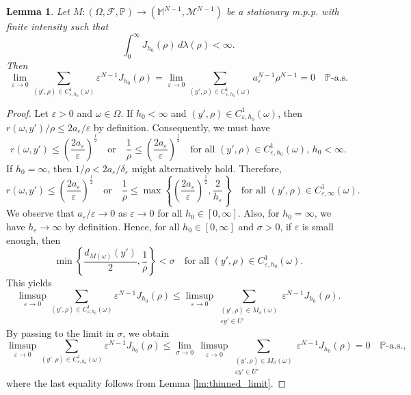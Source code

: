 \documentclass{article}
\numberwithin{equation}{section}
\newtheorem{lemma}[theorem]{Lemma}
\theoremstyle{definition}
\theoremstyle{remark}
\begin{document}
\begin{lemma} \label{lm:negligible_cluster_1}
    Let $M :(\Omega, \mathcal{F}, \mathbb{P}) \rightarrow (\mathbb{M}^{N - 1}, \mathcal{M}^{N - 1})$ be a stationary m.p.p. with finite intensity such that
    \[
    \int_0^\infty J_{h_0}(\rho) \, d\lambda(\rho) < \infty.
    \]
    Then
    \begin{equation} \label{eq:negligible_cluster_1}
        \lim_{\varepsilon \to 0} \sum_{(y', \rho) \in C_{\varepsilon, h_0}^1(\omega)} \varepsilon^{N - 1} J_{h_0}(\rho) = \lim_{\varepsilon \to 0} \sum_{(y', \rho) \in C_{\varepsilon, h_0}^1(\omega)} a_\varepsilon^{N - 1} \rho^{N - 1} = 0 \quad \mathbb{P}\text{-a.s.}
    \end{equation}
\end{lemma}

\begin{proof}
     Let $\varepsilon > 0$ and $\omega \in \Omega$. If $h_0 < \infty$ and $(y', \rho) \in C_{\varepsilon, h_0}^1(\omega)$, then $r(\omega, y')/\rho \le 2 a_\varepsilon/\varepsilon$ by definition. Consequently, we must have
    \[
    r(\omega, y') \le \left(\frac{2 a_\varepsilon}{\varepsilon}\right)^\frac{1}{2} \quad \text{or} \quad \frac{1}{\rho} \le \left(\frac{2 a_\varepsilon}{\varepsilon}\right)^\frac{1}{2} \quad \text{for all } (y', \rho) \in C_{\varepsilon, h_0}^1(\omega), \, h_0 < \infty.
    \]
    If $h_0 = \infty$, then $1/\rho < 2 a_\varepsilon/\delta_\varepsilon$ might alternatively hold. Therefore,
    \[
    r(\omega, y') \le \left(\frac{2 a_\varepsilon}{\varepsilon}\right)^\frac{1}{2} \quad \text{or} \quad \frac{1}{\rho} \le \max \left\{\left(\frac{2 a_\varepsilon}{\varepsilon}\right)^\frac{1}{2}, \frac{2}{h_\varepsilon}\right\} \quad \text{for all } (y', \rho) \in C_{\varepsilon, \infty}^1(\omega).
    \]
    We observe that $a_\varepsilon/\varepsilon \to 0$ as $\varepsilon \to 0$ for all $h_0 \in [0, \infty]$. Also, for $h_0 = \infty$, we have $h_\varepsilon \to \infty$ by definition. Hence, for all $h_0 \in [0, \infty]$ and $\sigma > 0$, if $\varepsilon$ is small enough, then
    \[
    \min \left\{\frac{d_{M(\omega)}(y')}{2}, \frac{1}{\rho}\right\} < \sigma \quad \text{for all } (y', \rho) \in C_{\varepsilon, h_0}^1(\omega).
    \]
    This yields
    \[
    \limsup_{\varepsilon \to 0} \sum_{(y', \rho) \in C_{\varepsilon, h_0}^1(\omega)} \varepsilon^{N - 1} J_{h_0}(\rho) \le \limsup_{\varepsilon \to 0} \sum \limits_{\substack{(y', \rho) \in M_\sigma(\omega) \\ \varepsilon y' \in U'}} \varepsilon^{N - 1} J_{h_0}(\rho).
    \]
    By passing to the limit in $\sigma$, we obtain
    \[
    \limsup_{\varepsilon \to 0} \sum_{(y', \rho) \in C_{\varepsilon, h_0}^1(\omega)} \varepsilon^{N - 1} J_{h_0}(\rho) \le \lim_{\sigma \to 0} \, \limsup_{\varepsilon \to 0} \sum \limits_{\substack{(y', \rho) \in M_\sigma(\omega) \\ \varepsilon y' \in U'}} \varepsilon^{N - 1} J_{h_0}(\rho) = 0 \quad \mathbb{P}\text{-a.s.},
    \]
    where the last equality follows from Lemma \ref{lm:thinned_limit}. 
    

\end{proof}
\end{document}
